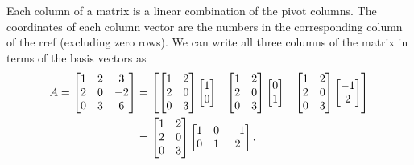 \begin{example}
{Each column of a matrix is a linear combination of the pivot columns.  The coordinates of each column vector are the numbers in the corresponding column of the rref (excluding zero rows).
}
We can write all three columns of the matrix in terms of the basis vectors as 
\begin{align*}
A=\begin{bmatrix}
\begin{matrix} 1\\2\\0 \end{matrix}
&\begin{matrix} 2\\0\\3 \end{matrix}
&\begin{matrix} 3\\-2\\6 \end{matrix}
\end{bmatrix}
&=
\begin{bmatrix}
\begin{bmatrix}\begin{matrix} 1\\2\\0 \end{matrix}&\begin{matrix} 2\\0\\3 \end{matrix}\end{bmatrix}\begin{bmatrix}1\\0\end{bmatrix}&
\begin{bmatrix}\begin{matrix} 1\\2\\0 \end{matrix}&\begin{matrix} 2\\0\\3 \end{matrix}\end{bmatrix}\begin{bmatrix}0\\1\end{bmatrix}&
\begin{bmatrix}\begin{matrix} 1\\2\\0 \end{matrix}&\begin{matrix} 2\\0\\3 \end{matrix}\end{bmatrix}\begin{bmatrix}-1\\2\end{bmatrix}
\end{bmatrix}
\\
&=
\begin{bmatrix}
\begin{matrix} 1\\2\\0 \end{matrix}
&\begin{matrix} 2\\0\\3 \end{matrix}
\end{bmatrix}
\begin{bmatrix}
\begin{matrix} 1\\0 \end{matrix}
&\begin{matrix} 0\\1 \end{matrix}
&\begin{matrix} -1\\2 \end{matrix}
\end{bmatrix}.
\end{align*}
\end{example}

